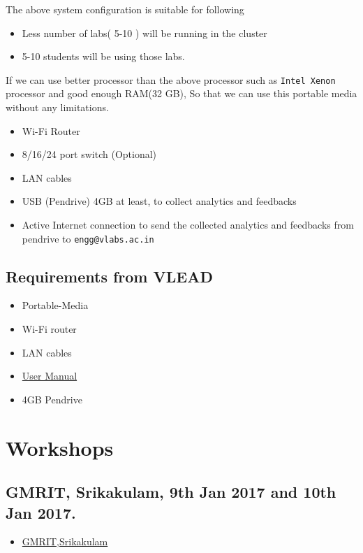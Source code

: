 \documentclass[11pt]{article}
\begin{document}
The above system configuration is suitable for following 
\begin{itemize}
\item Less number of labs( 5-10 ) will be running in the cluster
\item 5-10 students will be using those  labs.
\end{itemize}


If we can use better processor than the above processor such as
\texttt{Intel Xenon} processor and good enough RAM(32 GB), So that we can
use this portable media without any limitations.
\begin{itemize}
\item Wi-Fi Router
\item 8/16/24 port switch (Optional)
\item LAN cables
\item USB (Pendrive) 4GB at least, to collect analytics and feedbacks
\item Active Internet connection to send the collected analytics and
feedbacks from pendrive to \texttt{engg@vlabs.ac.in}
\end{itemize}

\subsection{Requirements from VLEAD}
\label{sec-3-2}
\begin{itemize}
\item Portable-Media
\item Wi-Fi router
\item LAN cables
\item \href{./user-manual-for-portablemedia.org}{User Manual}
\item 4GB Pendrive
\end{itemize}
\section{Workshops}
\label{sec-4}
\subsection{GMRIT, Srikakulam, 9th Jan 2017 and 10th Jan 2017.}
\label{sec-4-1}
\begin{itemize}
\item \href{./GMRIT-Srikakula.org}{GMRIT,Srikakulam}
\end{itemize}
\end{document}
